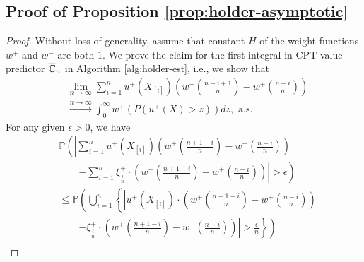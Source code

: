 \subsection*{Proof of Proposition \ref{prop:holder-asymptotic}}

\begin{proof}
Without loss of generality, assume that \holder constant $H$ of the weight functions $w^+$ and $w^-$ are both  $1$.
We prove the claim for the first integral in CPT-value predictor $\overline {\mathbb{C}}_n$ in Algorithm \ref{alg:holder-est}, i.e., we show  that 
\begin{align}
&\lim_{n\rightarrow \infty} \sum_{i=1}^{n} u^+\left(X_{[i]}\right) \left(w^+\left(\frac{n-i+1}{n}\right)- w^+\left(\frac{n-i}{n}\right)\right)\nonumber\\
&\xrightarrow{n \rightarrow\infty} \int_0^{\infty} w^+\left(P\left(u^+(X)>z\right)\right) dz , \text{ a.s.} 
\label{eq:claim11}
\end{align}
%
%
For any given $\epsilon>0$, we have 
\begin{align*}
& \mathbb{P} \left( \left| \sum_{i=1}^{n} u^+\left(X_{[i]}\right)  \left(w^+\left(\frac{n+1-i}{n} \right)  - w^+\left(\frac{n-i}{n} \right) \right) \right.\right. \\
&\qquad\left.\left.-\sum_{i=1}^{n} \xi^+_{\frac{i}{n}} \cdot \left(w^+\left(\frac{n+1-i}{n} \right)  - w^+\left(\frac{n-i}{n} \right) \right) \right| >
\epsilon\right) \\ 
& \leq \mathbb{P}\left( \bigcup _{i=1}^{n} \left\{ \left| u^+\left(X_{[i]}\right) \cdot \left(w^+\left(\frac{n+1-i}{n}\right) -
w^+\left(\frac{n-i}{n}\right)\right)\right.\right.\right. \\
&\qquad\left.\left.\left.- \xi^+_{\frac{i}{n}} \cdot \left(w^+\left(\frac{n+1-i}{n} \right)  - w^+\left(\frac{n-i}{n} \right) \right)
\right| > \frac{\epsilon}{n} \right\}\right) \\ 

\end{align*}
\end{proof}
